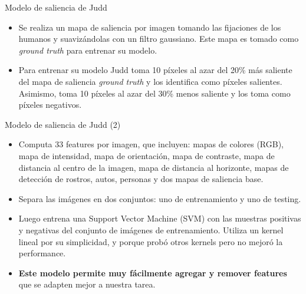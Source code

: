 \documentclass[compress]{beamer}
\begin{document}
\begin{frame}{Modelo de saliencia de Judd}
\begin{itemize}
\item Se realiza un mapa de saliencia por imagen tomando las fijaciones de los humanos y suavizándolas con un filtro gaussiano. Este mapa es tomado como \textit{ground truth} para entrenar su modelo.
\item Para entrenar su modelo Judd toma 10 píxeles al azar del 20\% más saliente del mapa de saliencia  \textit{ground truth} y los identifica como píxeles salientes. Asimismo, toma 10 píxeles al azar del 30\% menos saliente y los toma como píxeles negativos.
\end{itemize}
\end{frame}

\begin{frame}{Modelo de saliencia de Judd (2)}
\begin{itemize}
\item Computa 33 features por imagen, que incluyen: mapas de colores (RGB), mapa de intensidad, mapa de orientación, mapa de contraste, mapa de distancia al centro de la imagen, mapa de distancia al horizonte, mapas de detección de rostros, autos, personas y dos mapas de saliencia base.
\item Separa las imágenes en dos conjuntos: uno de entrenamiento y uno de testing. 
\item Luego entrena una Support Vector Machine (SVM) con las muestras positivas y negativas del conjunto de imágenes de entrenamiento. Utiliza un kernel lineal por su simplicidad, y porque probó otros kernels pero no mejoró la performance.
\item \textbf{Este modelo permite muy fácilmente agregar y remover features} que se adapten mejor a nuestra tarea.
\end{itemize}
\end{frame}
\end{document}
